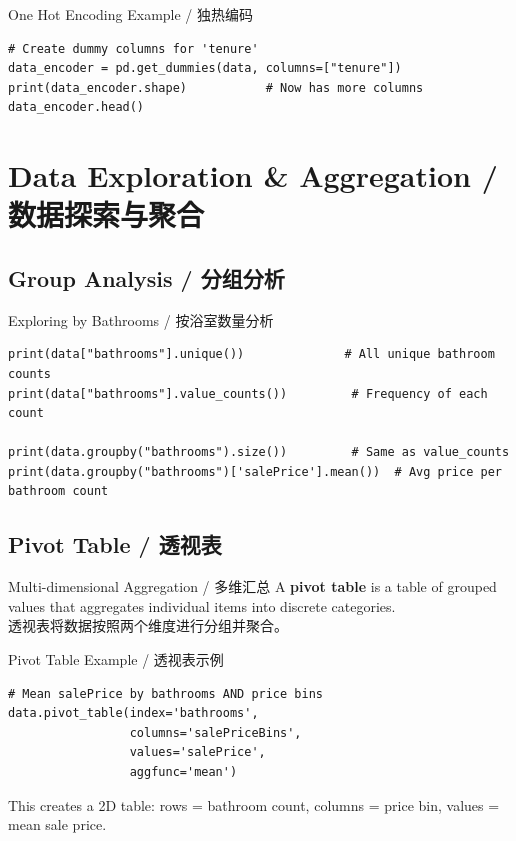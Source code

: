 \documentclass[11pt,a4paper]{report}
\begin{document}
\begin{examplebox}{One Hot Encoding Example / 独热编码}
\begin{lstlisting}
# Create dummy columns for 'tenure'
data_encoder = pd.get_dummies(data, columns=["tenure"])
print(data_encoder.shape)           # Now has more columns
data_encoder.head()
\end{lstlisting}
\end{examplebox}

\section{Data Exploration \& Aggregation / 数据探索与聚合}

\subsection{Group Analysis / 分组分析}

\begin{examplebox}{Exploring by Bathrooms / 按浴室数量分析}
\begin{lstlisting}
print(data["bathrooms"].unique())              # All unique bathroom counts
print(data["bathrooms"].value_counts())         # Frequency of each count

print(data.groupby("bathrooms").size())         # Same as value_counts
print(data.groupby("bathrooms")['salePrice'].mean())  # Avg price per bathroom count
\end{lstlisting}
\end{examplebox}

\subsection{Pivot Table / 透视表}

\begin{concept}{Multi-dimensional Aggregation / 多维汇总}
    A \textbf{pivot table} is a table of grouped values that aggregates individual items into discrete categories. \\
    透视表将数据按照两个维度进行分组并聚合。
\end{concept}

\begin{examplebox}{Pivot Table Example / 透视表示例}
\begin{lstlisting}
# Mean salePrice by bathrooms AND price bins
data.pivot_table(index='bathrooms',
                 columns='salePriceBins',
                 values='salePrice',
                 aggfunc='mean')
\end{lstlisting}
    This creates a 2D table: rows = bathroom count, columns = price bin, values = mean sale price.
\end{examplebox}
\end{document}
